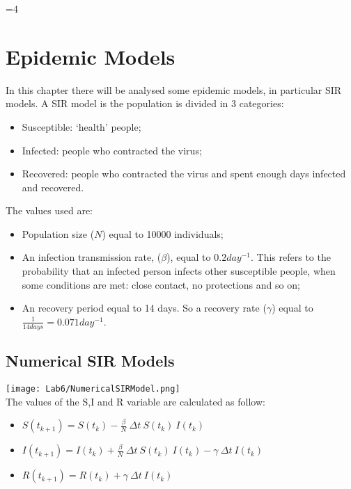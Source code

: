 \documentclass{report}
\newcounter{debug}
\begin{document}
\ifnum\value{debug}=4 {
    
\chapter{Epidemic Models}
	In this chapter there will be analysed some epidemic models, in particular SIR models. A SIR model is the population is divided in 3 categories:
	\begin{itemize}
					\item Susceptible: `health' people;
					\item Infected: people who contracted the virus;
					\item Recovered: people who contracted the virus and spent enough days infected and recovered.
				\end{itemize}
				
	The values used are:
	\begin{itemize}
					\item Population size ($N$) equal to 10000 individuals;
					\item An infection transmission rate, ($\beta$), equal to $0.2 day^{-1}$. This refers to the probability that an infected person infects other susceptible people, when some conditions are met: close contact, no protections and so on;
					\item An recovery period equal to 14 days. So a recovery rate ($\gamma$) equal to $\frac{1}{14 days}=0.071 day^{-1}$.
				\end{itemize}
				
				
	 \section{Numerical SIR Models}
	 						\texttt{[image: Lab6/NumericalSIRModel.png]} \\
								The values of the S,I and R variable are calculated as follow:
								\begin{itemize}
								  \item[] \hspace{5cm} $S(t_{k+1}) = S(t_{k}) - \frac{\beta}{N} \: \Delta t \: S(t_{k}) \: I(t_{k})$
									\item[] \hspace{5cm} $I(t_{k+1}) = I(t_{k}) + \frac{\beta}{N} \: \Delta t \: S(t_{k}) \: I(t_{k}) - \gamma \: \Delta t \: I(t_k)$
									\item[] \hspace{5cm} $R(t_{k+1}) = R(t_{k}) + \gamma \: \Delta t \: I(t_k)$
								\end{itemize}
								
}
\end{document}
